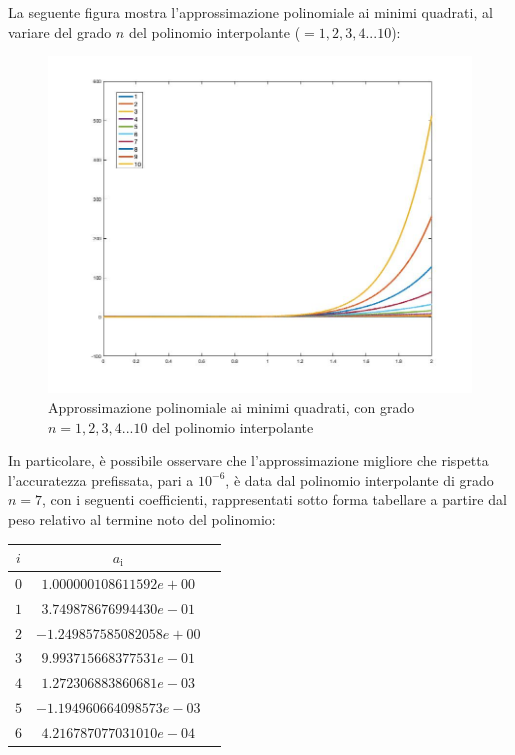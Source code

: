 La seguente figura mostra l'approssimazione polinomiale ai minimi quadrati, al variare del grado $n$ del polinomio interpolante ($=1,2,3,4...10$):
\begin{figure}[H]
	\includegraphics[width=\textwidth]{Chapter-4/Exercise-21/plot.jpg}
	\caption*{Approssimazione polinomiale ai minimi quadrati, con grado $n=1,2,3,4...10$ del polinomio interpolante}
\end{figure}

In particolare, è possibile osservare che l'approssimazione migliore che rispetta l'accuratezza prefissata, pari a $10^{-6}$, è data dal polinomio interpolante di grado $n = 7$, con i seguenti coefficienti,
rappresentati sotto forma tabellare a partire dal peso relativo al termine noto del polinomio:
\begin{table}[H]
	\centering
	\begin{tabular}{|c|c|c|}
		\hline
		$i$ & $a_\mathrm{i}$ \\
		\hline
		$0$ & $1.000000108611592e+00$ \\ 
		$1$ & $3.749878676994430e-01$ \\ 
		$2$ & $-1.249857585082058e+00$ \\ 
		$3$ & $9.993715668377531e-01$ \\ 
		$4$ & $1.272306883860681e-03$ \\ 
		$5$ & $-1.194960664098573e-03$ \\ 
		$6$ & $4.216787077031010e-04$ \\ 
		\hline
	\end{tabular}
\end{table}
